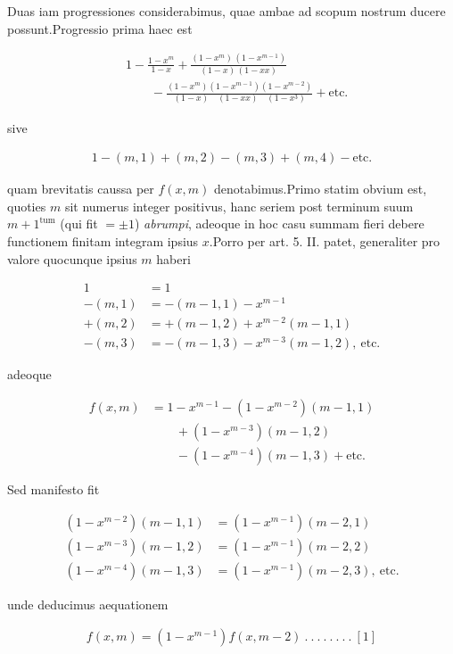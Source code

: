 
Duas iam progressiones considerabimus, quae ambae ad scopum nostrum ducere possunt.\quad Progressio prima haec est

\[
\begin{aligned}
&1-\frac{1-x^m}{1-x}+\frac{(1-x^m)\,(1-x^{m-1})}{(1-x)\,(1-xx)}\\
&\qquad-\frac{(1-x^m)(1-x^{m-1})(1-x^{m-2})}{(1-x)\quad(1-xx)\quad(1-x^3)}+\text{etc.}
\end{aligned}
\]

sive

\[
\begin{aligned}
1-(m,1)+(m,2)-(m,3)+(m,4)-\text{etc.}
\end{aligned}
\]

quam brevitatis caussa per $f(x,m)$ denotabimus.\quad Primo statim obvium est, quoties $m$ sit numerus integer positivus, hanc seriem post terminum suum $m+1^{\mathrm{tum}}$ (qui fit $=\pm1$) \emph{abrumpi}, adeoque in hoc casu summam fieri debere functionem finitam integram ipsius $x$.\quad Porro per art. 5. II. patet, generaliter pro valore quocunque ipsius $m$ haberi

\[
\begin{aligned}
1&=1\\
-(m,1)&=-(m-1,1)-x^{m-1}\\
+(m,2)&=+(m-1,2)+x^{m-2}(m-1,1)\\
-(m,3)&=-(m-1,3)-x^{m-3}(m-1,2),\ \text{etc.}
\end{aligned}
\]

adeoque

\[
\begin{aligned}
f(x,m)&=1-x^{m-1}-(1-x^{m-2})(m-1,1)\\
&\qquad+(1-x^{m-3})(m-1,2)\\
&\qquad-(1-x^{m-4})(m-1,3)+\text{etc.}
\end{aligned}
\]

Sed manifesto fit

\[
\begin{aligned}
(1-x^{m-2})(m-1,1)&=(1-x^{m-1})(m-2,1)\\
(1-x^{m-3})(m-1,2)&=(1-x^{m-1})(m-2,2)\\
(1-x^{m-4})(m-1,3)&=(1-x^{m-1})(m-2,3),\ \text{etc.}
\end{aligned}
\]

unde deducimus aequationem

\[
\begin{aligned}
f(x,m)=(1-x^{m-1})f(x,m-2)\ .\ .\ .\ .\ .\ .\ .\ .\ [1]
\end{aligned}
\]

